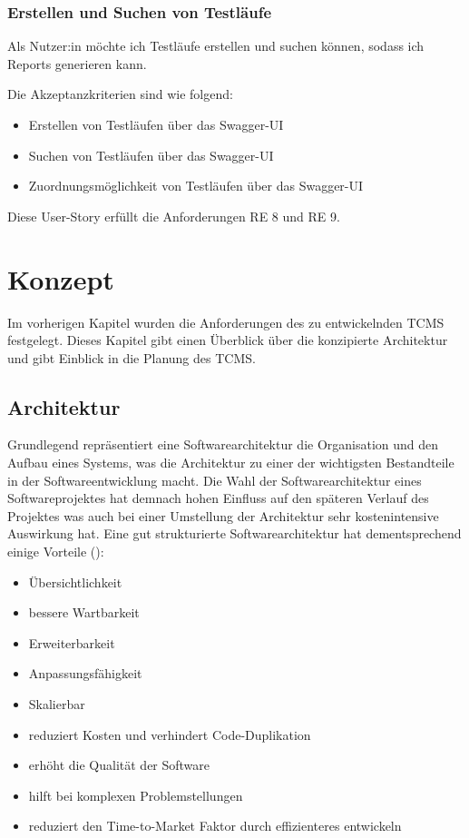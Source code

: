 \documentclass[a4paper, fontsize=11pt, parskip=half, twoside]{scrreprt}
\begin{document}
	\subsection{Erstellen und Suchen von Testläufe}
	Als Nutzer:in möchte ich Testläufe erstellen und suchen können, sodass ich Reports generieren kann.
	
	Die Akzeptanzkriterien sind wie folgend:
	\begin{itemize}
		\item Erstellen von Testläufen über das Swagger-UI
		\item Suchen von Testläufen über das Swagger-UI
		\item Zuordnungsmöglichkeit von Testläufen über das Swagger-UI
	\end{itemize}
	
	Diese User-Story erfüllt die Anforderungen RE 8 und RE 9.
	
	\chapter{Konzept}
	Im vorherigen Kapitel wurden die Anforderungen des zu entwickelnden \ac{TCMS} festgelegt.
	Dieses Kapitel gibt einen Überblick über die konzipierte Architektur und gibt Einblick in die Planung des \ac{TCMS}.
	
	\section{Architektur}
	Grundlegend repräsentiert eine Softwarearchitektur die Organisation und den Aufbau eines Systems, was die Architektur zu einer der wichtigsten Bestandteile in der Softwareentwicklung macht.
	Die Wahl der Softwarearchitektur eines Softwareprojektes hat demnach hohen Einfluss auf den späteren Verlauf des Projektes was auch bei einer Umstellung der Architektur sehr kostenintensive Auswirkung hat. 
	Eine gut strukturierte Softwarearchitektur hat dementsprechend einige Vorteile (\textcite{richards_fundamentals_2020}):
	
	\begin{itemize}
		\item Übersichtlichkeit
		\item bessere Wartbarkeit
		\item Erweiterbarkeit
		\item Anpassungsfähigkeit
		\item Skalierbar
		\item reduziert Kosten und verhindert Code-Duplikation
		\item erhöht die Qualität der Software
		\item hilft bei komplexen Problemstellungen
		\item reduziert den Time-to-Market Faktor durch effizienteres entwickeln
	\end{itemize}
	
\end{document}

